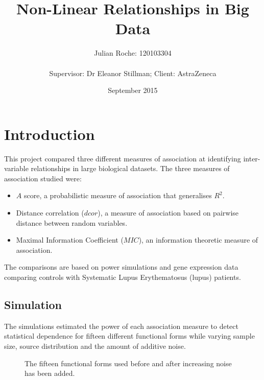 \documentclass[a4paper, landscape, 20pt]{extreport}
\title{\color{Blue} Non-Linear Relationships in Big Data}
\author{Julian Roche: 120103304 \\ \\ Supervisor: Dr Eleanor Stillman; Client: AstraZeneca }
\date{September 2015}
\begin{document}
\pagestyle{myheadings}

\maketitle

\section*{\color{Blue} Introduction}

This project compared three different measures of association at identifying inter-variable relationships in large biological datasets. The three measures of association studied were:

\begin{itemize}
\item $A$ score, a probabilistic measure of association that generalises $R^2$.
\item Distance correlation ($dcor$), a measure of association based on pairwise distance between random variables.
\item Maximal Information Coefficient ($MIC$), an information theoretic measure of association.
\end{itemize}

The comparisons are based on power simulations and gene expression data comparing controls with Systematic Lupus Erythematosus (lupus) patients.

\newpage
\subsection*{\color{Blue} Simulation}
The simulations estimated the power of each association measure to detect statistical dependence for fifteen different functional forms while varying sample size, source distribution and the amount of additive noise.
	
\begin{figure}[H]
    \centering
    \qquad
    \caption{The fifteen functional forms used before and after increasing noise has been added.}
\end{figure}
\end{document}

